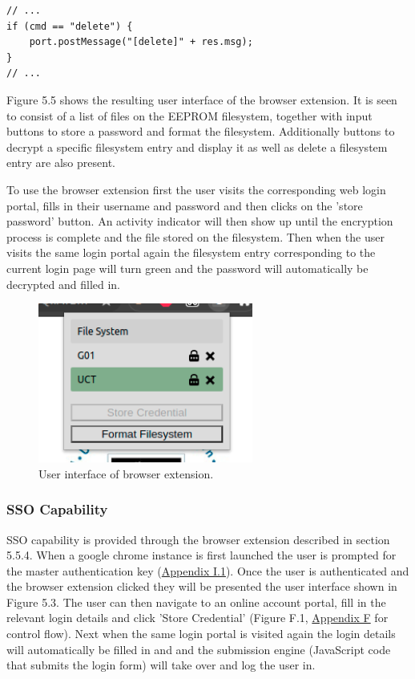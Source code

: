 \begin{lstlisting}[]
// ...
if (cmd == "delete") {
    port.postMessage("[delete]" + res.msg);
}
// ...
\end{lstlisting}

Figure 5.5 shows the resulting user interface of the browser extension. It is seen to consist of a list of files on the EEPROM filesystem, together with input buttons to store a password and format the filesystem. Additionally buttons to decrypt a specific filesystem entry and display it as well as delete a filesystem entry are also present.

To use the browser extension first the user visits the corresponding web login portal, fills in their username and password and then clicks on the 'store password' button. An activity indicator will then show up until the encryption process is complete and the file stored on the filesystem. Then when the user visits the same login portal again the filesystem entry corresponding to the current login page will turn green and the password will automatically be decrypted and filled in.

\begin{figure}[H]
\centering
\includegraphics[width=0.35\columnwidth]{Figures/Fig_53.png}
\caption{User interface of browser extension.}
\label{fig:gantt}
\end{figure}

\subsubsection{SSO Capability}

SSO capability is provided through the browser extension described in section 5.5.4. When a google chrome instance is first launched the user is prompted for the master authentication key (\hyperref[sec:bext1]{Appendix I.1}). Once the user is authenticated and the browser extension clicked they will be presented the user interface shown in Figure 5.3. The user can then navigate to an online account portal, fill in the relevant login details and click 'Store Credential' (Figure F.1, \hyperref[sec:credflow]{Appendix F} for control flow). Next when the same login portal is visited again the login details will automatically be filled in and and the submission engine (JavaScript code that submits the login form) will take over and log the user in.

